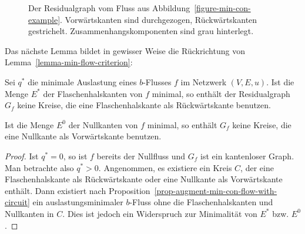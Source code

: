 \begin{figure}
\begin{subfigure}{\textwidth}
\begin{tikzpicture}[lul/.style={draw,
			ellipse,
			fill=white,
			align=center,
			inner sep=0pt,
			outer sep=4pt,
			text width=7mm,
			minimum height=1.5cm
		},
		scale=1]
		\end{tikzpicture}
	\end{subfigure}
	\caption{Der Residualgraph vom Fluss aus Abbildung~\ref{figure-min-con-example}. Vorwärtskanten sind durchgezogen, Rückwärtskanten gestrichelt. Zusammenhangskomponenten sind grau hinterlegt.}
\end{figure}

Das nächste Lemma bildet in gewisser Weise die Rückrichtung von Lemma~\ref{lemma-min-flow-criterion}:

\begin{lemma}\label{lemma-no-circle-in-res-graph-inclus-min}
	Sei $q^*$ die minimale Auslastung eines $b$-Flusses $f$ im Netzwerk $(V, E, u)$.
	Ist die Menge $E^*$ der Flaschenhalskanten von $f$ minimal, so enthält der Residualgraph $G_f$ keine Kreise, die eine Flaschenhals\-kante als Rückwärts\-kante benutzen.
	
	Ist die Menge $E^0$ der Nullkanten von $f$ minimal, so enthält $G_f$ keine Kreise, die eine Nullkante als Vorwärts\-kante benutzen.
\end{lemma}
\begin{proof}
	Ist $q^* = 0$, so ist $f$ bereits der Nullfluss und $G_f$ ist ein kantenloser Graph.
	Man betrachte also $q^* > 0$.
	Angenommen, es existiere ein Kreis $C$, der eine Flaschenhalskante als Rückwärtskante oder eine Nullkante als Vorwärtskante enthält.
	Dann existiert nach Proposition~\ref{prop-augment-min-con-flow-with-circuit} ein auslastungsminimaler $b$-Fluss ohne die Flaschenhalskanten und Nullkanten in $C$.
	Dies ist jedoch ein Widerspruch zur Minimalität von $E^*$ bzw. $E^0$.
\end{proof}


